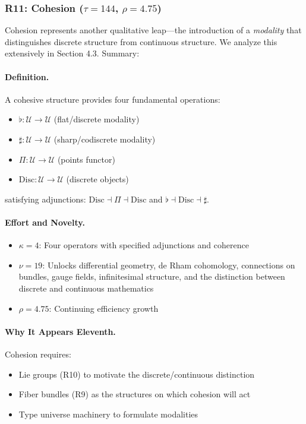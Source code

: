 \documentclass[11pt]{article}
\theoremstyle{definition}
\begin{document}
\subsubsection{R11: Cohesion ($\tau=144$, $\rho=4.75$)}

Cohesion represents another qualitative leap—the introduction of a \emph{modality} that distinguishes discrete structure from continuous structure. We analyze this extensively in Section 4.3. Summary:

\paragraph{Definition.}
A cohesive structure provides four fundamental operations:
\begin{itemize}
\item $\flat : \mathcal{U} \to \mathcal{U}$ (flat/discrete modality)
\item $\sharp : \mathcal{U} \to \mathcal{U}$ (sharp/codiscrete modality)  
\item $\Pi : \mathcal{U} \to \mathcal{U}$ (points functor)
\item $\text{Disc} : \mathcal{U} \to \mathcal{U}$ (discrete objects)
\end{itemize}
satisfying adjunctions: $\text{Disc} \dashv \Pi \dashv \text{Disc}$ and $\flat \dashv \text{Disc} \dashv \sharp$.

\paragraph{Effort and Novelty.}
\begin{itemize}
\item $\kappa = 4$: Four operators with specified adjunctions and coherence
\item $\nu = 19$: Unlocks differential geometry, de Rham cohomology, connections on bundles, gauge fields, infinitesimal structure, and the distinction between discrete and continuous mathematics
\item $\rho = 4.75$: Continuing efficiency growth
\end{itemize}

\paragraph{Why It Appears Eleventh.}
Cohesion requires:
\begin{itemize}
\item Lie groups (R10) to motivate the discrete/continuous distinction
\item Fiber bundles (R9) as the structures on which cohesion will act
\item Type universe machinery to formulate modalities
\end{itemize}
\end{document}
